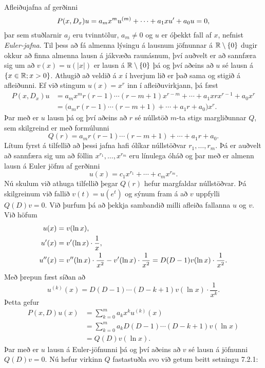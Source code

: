 \noindent
Afleiðujafna af gerðinni
\begin{equation*}
P(x,D_x)u=
a_mx^mu^{(m)}+\cdots+a_1xu{\sp{\prime}}+a_0u=0,\label{2.3.1}
\end{equation*}
þar sem stuðlarnir $a_j$ eru tvinntölur, $a_m\neq 0$ og $u$ er óþekkt
fall af $x$, nefnist {\it Euler-jafna}.  
Til þess að fá almenna lýsingu á lausnum jöfnunnar á ${\mathbb R}\setminus{\{0\}}$
dugir okkur að finna almenna lausn á jákvæða raunásnum, því auðvelt er
að sannfæra sig um að $v(x)=u(|x|)$ er lausn á ${\mathbb R}\setminus{\{0\}}$ þá og
því aðeins að $u$ sé lausn á ${\{x\in {\mathbb R}; x>0\}}$.
Athugið að veldið á $x$ í
hverjum lið er það sama og stigið á afleiðunni.  Ef við stingum 
$u(x)=x^r$ inn í afleiðuvirkjann, þá fæst
\begin{align*}
P(x,D_x)u
&=a_mx^m r(r-1)\cdots(r-m+1)x^{r-m}
+\cdots+a_1xrx^{r-1}+a_0x^r\\
&=\big(a_m r(r-1)\cdots(r-m+1)+
\cdots+a_1r+a_0\big)x^r.
\end{align*}
Þar með er $u$ lausn þá og því aðeins að $r$ sé núllstöð $m$-ta stigs
margliðunnar $Q$, sem skilgreind er með formúlunni
\begin{equation*}
Q(r)=a_m r(r-1)\cdots(r-m+1)+
\cdots+a_1r+a_0.\label{2.3.2}
\end{equation*}
Lítum fyrst á tilfellið að þessi jafna hafi ólíkar núllstöðvar
$r_1,\dots, r_m$. 
Þá er auðvelt að sannfæra sig  um að
föllin $x^{r_1},\dots,x^{r_m}$ eru línulega óháð og þar
með er almenn lausn á Euler jöfnu af gerðinni
\begin{equation*}
u(x)=c_1x^{r_1}+\cdots+c_mx^{r_m}.\label{2.3.3}
\end{equation*}
Nú skulum við athuga tilfellið þegar $Q(r)$ hefur margfaldar
núllstöðvar.  Þá skilgreinum við fallið $v(t)=u(e^t)$ og sýnum fram á að
$v$ uppfylli  $Q(D)v=0$.  Við 
þurfum þá að þekkja sambandið milli afleiða fallanna $u$ og $v$.
Við höfum
\begin{align*}
u(x)&=v(\ln x),\\
u{\sp{\prime}}(x)&=v{\sp{\prime}}(\ln x)\cdot \dfrac 1x,\\
u{\sp{\prime\prime}}(x)&=v{\sp{\prime\prime}}(\ln x)\cdot \dfrac 1{x^2}
-v{\sp{\prime}}(\ln x)\cdot \dfrac 1{x^2} = D(D-1)v(\ln x)\cdot \dfrac 1{x^2}.
\end{align*}
Með þrepun fæst síðan að 
\begin{equation*}
u^{(k)}(x)=D(D-1)\cdots(D-k+1)v(\ln x)\cdot \dfrac 1{x^k}.
\label{2.3.4}
\end{equation*}
Þetta gefur 
\begin{align*}
P(x,D)u(x)&=\sum\limits_{k=0}^m a_kx^ku^{(k)}(x)\\
&=\sum\limits_{k=0}^m a_kD(D-1)\cdots(D-k+1)v(\ln x)\\
&=Q(D)v(\ln x).
\end{align*}
Þar með er $u$ lausn
á Euler-jöfnunni þá og því aðeins að $v$ sé lausn á jöfnunni 
$Q(D)v=0$.  Nú hefur virkinn $Q$ fastastuðla svo við getum beitt 
setningu 7.2.1:

